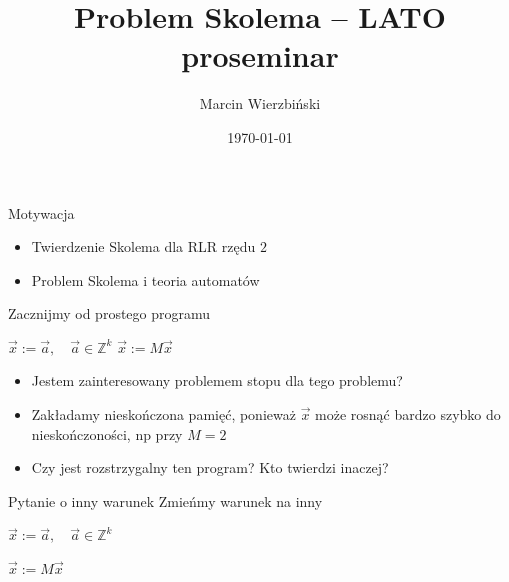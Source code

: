 \documentclass[handout]{beamer}
\title{Problem Skolema -- LATO proseminar}
\author{Marcin Wierzbiński}
\institute{MIMUW}
\date{\today}
\def\Z{\mathbb Z}
\theoremstyle{definition}
\begin{document}
\frame{\titlepage}

\begin{frame}{Motywacja}
\begin{itemize}
    \item Twierdzenie Skolema dla RLR rzędu $2$
    \item Problem Skolema i teoria automatów
\end{itemize}
\end{frame}

\begin{frame}{Zacznijmy od prostego programu}
    \begin{algorithm}[H] 
        \begin{algorithmic}[l]
        \State $\vec{x} := \vec{a}, \quad \vec{a} \in \Z^{k}$  
          \State $\vec{x} := M \vec{x}$ \algorithmiccomment{$M \in \Z^{k \times k}$}
          
        \EndWhile
        \end{algorithmic}
    \end{algorithm}
    
    \begin{itemize}
    \pause 
    \item Jestem zainteresowany problemem stopu dla tego problemu? 
    
    
    \item  Zakładamy nieskończona pamięć, ponieważ $\vec{x}$ może rosnąć bardzo szybko do nieskończoności, np przy $M=2$
    \pause
    
    \item  Czy jest rozstrzygalny ten program? Kto twierdzi inaczej?
    \end{itemize}

\end{frame}

\begin{frame}{Pytanie o inny warunek}
    Zmieńmy warunek na inny 
    \begin{algorithm}[H] 
        \begin{algorithmic}[l]
        \State $\vec{x} := \vec{a},  \quad \vec{a} \in \Z^{k}$  

          \State $\vec{x} := M \vec{x}$ \algorithmiccomment{$M \in \Z^{k \times k}$}
          
        \EndWhile
        \end{algorithmic}
    \end{algorithm}
\end{frame}    
\end{document}
